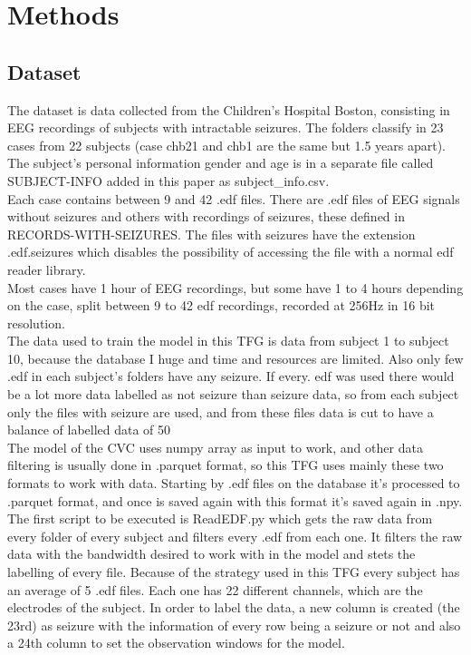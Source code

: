 \section{Methods}
\subsection{Dataset}
The dataset is data collected from the Children’s Hospital Boston, consisting in EEG recordings of subjects with intractable seizures. The folders classify in 23 cases from 22 subjects (case chb21 and chb1 are the same but 1.5 years apart). The subject’s personal information gender and age is in a separate file called SUBJECT-INFO added in this paper as subject\_info.csv.
\\
Each case contains between 9 and 42 .edf files. There are .edf files of EEG signals without seizures and others with recordings of seizures, these defined in RECORDS-WITH-SEIZURES. The files with seizures have the extension .edf.seizures which disables the possibility of accessing the file with a normal edf reader library.
\\
Most cases have 1 hour of EEG recordings, but some have 1 to 4 hours depending on the case, split between 9 to 42 edf recordings, recorded at 256Hz in 16 bit resolution.
\\
The data used to train the model in this TFG is data from subject 1 to subject 10, because the database I huge and time and resources are limited. Also only few .edf in each subject’s folders have any seizure. If every. edf was used there would be a lot more data labelled as not seizure than seizure data, so from each subject only the files with seizure are used, and from these files data is cut to have a balance of labelled data of 50%
\\
The model of the CVC uses numpy array as input to work, and other data filtering is usually done in .parquet format, so this TFG uses mainly these two formats to work with data. Starting by .edf files on the database it’s processed to .parquet format, and once is saved again with this format it’s saved again in .npy.
\\
The first script to be executed is ReadEDF.py which gets the raw data from every folder of every subject and filters every .edf from each one. It filters the raw data with the bandwidth desired to work with in the model and stets the labelling of every file. Because of the strategy used in this TFG every subject has an average of 5 .edf files. Each one has 22 different channels, which are the electrodes of the subject. In order to label the data, a new column is created (the 23rd) as seizure with the information of every row being a seizure or not and also a 24th column to set the observation windows for the model.
